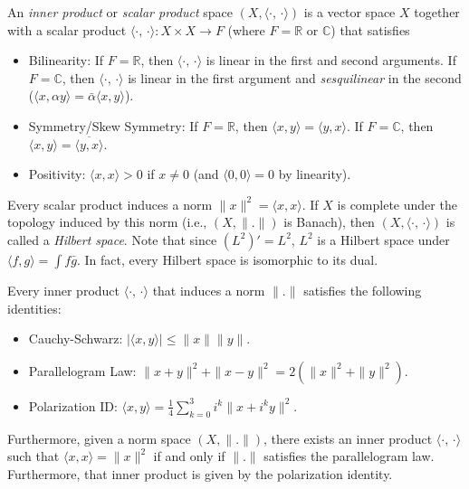 \documentclass[12pt]{article}
\begin{document}
An {\it inner product} or {\it scalar product} space 
$(X, \langle \cdot\text{, }\cdot \rangle)$ is a vector space $X$
together with a scalar product 
$\langle\cdot\text{, }\cdot\rangle : X \times X \rightarrow F$
(where $F = \mathbb{R}$ or $\mathbb{C}$) that satisfies
\begin{itemize}
	\item Bilinearity: If $F = \mathbb{R}$, then
		$\langle\cdot\text{, }\cdot\rangle$ is linear in the first
		and second arguments. If $F = \mathbb{C}$, then
		$\langle\cdot\text{, }\cdot\rangle$ is linear in the first
		argument and {\it sesquilinear} in the second
		($\langle x,\alpha y\rangle={\bar\alpha}\langle x,y\rangle$).
	\item Symmetry/Skew Symmetry: If $F = \mathbb{R}$, then
		$\langle x, y\rangle = \langle y, x\rangle$.
		If $F = \mathbb{C}$, then
		$\langle x, y\rangle = \overline{\langle y, x\rangle}$.
	\item Positivity: $\langle x,x \rangle > 0$ if $x\neq 0$
		(and $\langle 0, 0 \rangle = 0$ by linearity).
\end{itemize}
Every scalar product induces a norm $\|x\|^2 = \langle x, x\rangle$.
If $X$ is complete under the topology induced by this norm (i.e., 
$(X, \|.\|)$ is Banach), then $(X, \langle\cdot\text{, }\cdot\rangle)$
is called a {\it Hilbert space}. Note that since $(L^2)' = L^2$,
$L^2$ is a Hilbert space under $\langle f, g \rangle = \int f{\bar g}$.
In fact, every Hilbert space is isomorphic to its dual.

Every inner product $\langle\cdot\text{, }\cdot\rangle$ that induces a
norm $\|.\|$ satisfies the following identities:
\begin{itemize}
	\item Cauchy-Schwarz: $|\langle x,y\rangle| \leq \|x\|\|y\|$.
	\item Parallelogram Law: $\|x+y\|^2+\|x-y\|^2=2(\|x\|^2+\|y\|^2)$.
	\item Polarization ID: 
		$\langle x,y\rangle=\frac{1}{4}\sum_{k=0}^3 i^k\|x+i^k y\|^2$.
\end{itemize}
Furthermore, given a norm space $(X, \|.\|)$, there exists an inner product
$\langle\cdot\text{, }\cdot\rangle$ such that $\langle x,x\rangle = \|x\|^2$
if and only if $\|.\|$ satisfies the parallelogram law. Furthermore, that
inner product is given by the polarization identity.
\end{document}
